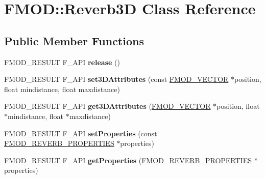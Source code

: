 \hypertarget{class_f_m_o_d_1_1_reverb3_d}{\section{F\+M\+O\+D\+:\+:Reverb3\+D Class Reference}
\label{class_f_m_o_d_1_1_reverb3_d}
}
\subsection*{Public Member Functions}
\begin{DoxyCompactItemize}
\item 
\hypertarget{class_f_m_o_d_1_1_reverb3_d_a727b122d300135459a2f1cd59d0d7941}{F\+M\+O\+D\+\_\+\+R\+E\+S\+U\+L\+T F\+\_\+\+A\+P\+I {\bfseries release} ()}\label{class_f_m_o_d_1_1_reverb3_d_a727b122d300135459a2f1cd59d0d7941}

\item 
\hypertarget{class_f_m_o_d_1_1_reverb3_d_aaeb05688174876fec05c1f3bc0576be8}{F\+M\+O\+D\+\_\+\+R\+E\+S\+U\+L\+T F\+\_\+\+A\+P\+I {\bfseries set3\+D\+Attributes} (const \hyperlink{struct_f_m_o_d___v_e_c_t_o_r}{F\+M\+O\+D\+\_\+\+V\+E\+C\+T\+O\+R} $\ast$position, float mindistance, float maxdistance)}\label{class_f_m_o_d_1_1_reverb3_d_aaeb05688174876fec05c1f3bc0576be8}

\item 
\hypertarget{class_f_m_o_d_1_1_reverb3_d_a0778c0c504ff5c3d4e5e2b8e66e9c31d}{F\+M\+O\+D\+\_\+\+R\+E\+S\+U\+L\+T F\+\_\+\+A\+P\+I {\bfseries get3\+D\+Attributes} (\hyperlink{struct_f_m_o_d___v_e_c_t_o_r}{F\+M\+O\+D\+\_\+\+V\+E\+C\+T\+O\+R} $\ast$position, float $\ast$mindistance, float $\ast$maxdistance)}\label{class_f_m_o_d_1_1_reverb3_d_a0778c0c504ff5c3d4e5e2b8e66e9c31d}

\item 
\hypertarget{class_f_m_o_d_1_1_reverb3_d_a567c38962a1063fdfa74353b7991ed89}{F\+M\+O\+D\+\_\+\+R\+E\+S\+U\+L\+T F\+\_\+\+A\+P\+I {\bfseries set\+Properties} (const \hyperlink{struct_f_m_o_d___r_e_v_e_r_b___p_r_o_p_e_r_t_i_e_s}{F\+M\+O\+D\+\_\+\+R\+E\+V\+E\+R\+B\+\_\+\+P\+R\+O\+P\+E\+R\+T\+I\+E\+S} $\ast$properties)}\label{class_f_m_o_d_1_1_reverb3_d_a567c38962a1063fdfa74353b7991ed89}

\item 
\hypertarget{class_f_m_o_d_1_1_reverb3_d_a63821bb5d2f34e3f246cb91e49188871}{F\+M\+O\+D\+\_\+\+R\+E\+S\+U\+L\+T F\+\_\+\+A\+P\+I {\bfseries get\+Properties} (\hyperlink{struct_f_m_o_d___r_e_v_e_r_b___p_r_o_p_e_r_t_i_e_s}{F\+M\+O\+D\+\_\+\+R\+E\+V\+E\+R\+B\+\_\+\+P\+R\+O\+P\+E\+R\+T\+I\+E\+S} $\ast$properties)}\label{class_f_m_o_d_1_1_reverb3_d_a63821bb5d2f34e3f246cb91e49188871}


\end{DoxyCompactItemize}
